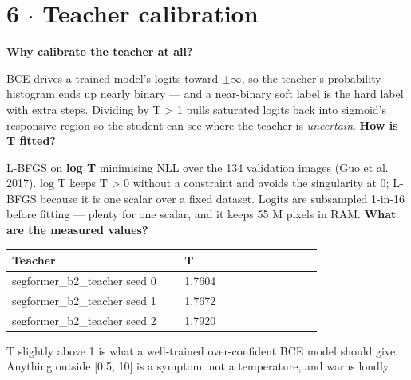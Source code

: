 \documentclass[10pt,a4paper]{article}
\newcommand{\qq}[1]{\medskip\noindent\textbf{\color{navy}#1}\par\nobreak}
\begin{document}
\section*{6 $\cdot$ Teacher calibration}
\qq{Why calibrate the teacher at all?}
BCE drives a trained model's logits toward $\pm$$\infty$, so the teacher's probability histogram ends up nearly binary — and a near-binary soft label is the hard label with extra steps. Dividing by T > 1 pulls saturated logits back into sigmoid's responsive region so the student can see where the teacher is \textit{uncertain}.
\qq{How is T fitted?}
L-BFGS on \textbf{log T} minimising NLL over the 134 validation images (Guo et al. 2017). log T keeps T > 0 without a constraint and avoids the singularity at 0; L-BFGS because it is one scalar over a fixed dataset. Logits are subsampled 1-in-16 before fitting — plenty for one scalar, and it keeps 55 M pixels in RAM.
\qq{What are the measured values?}
\begin{center}\small\begin{tabular}{p{0.5\linewidth}p{0.4\linewidth}}
\toprule
\textbf{Teacher} & \textbf{T} \\
\midrule
segformer_b2_teacher seed 0 & 1.7604 \\
segformer_b2_teacher seed 1 & 1.7672 \\
segformer_b2_teacher seed 2 & 1.7920 \\
\bottomrule\end{tabular}\end{center}
T slightly above 1 is what a well-trained over-confident BCE model should give. Anything outside [0.5, 10] is a symptom, not a temperature, and warns loudly.
\end{document}
